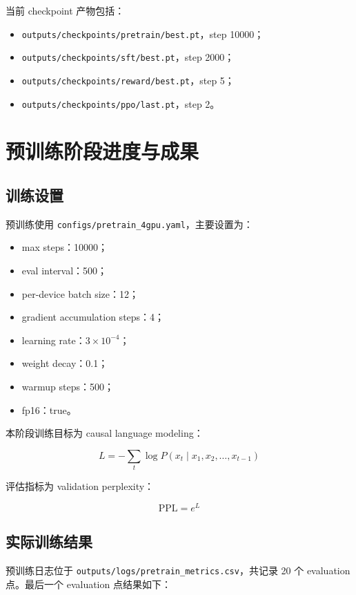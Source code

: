 \documentclass[UTF8,zihao=-4]{ctexart}
\begin{document}
当前 checkpoint 产物包括：

\begin{itemize}
  \item \texttt{outputs/checkpoints/pretrain/best.pt}，step 10000；
  \item \texttt{outputs/checkpoints/sft/best.pt}，step 2000；
  \item \texttt{outputs/checkpoints/reward/best.pt}，step 5；
  \item \texttt{outputs/checkpoints/ppo/last.pt}，step 2。
\end{itemize}

\section{预训练阶段进度与成果}

\subsection{训练设置}

预训练使用 \texttt{configs/pretrain\_4gpu.yaml}，主要设置为：

\begin{itemize}
  \item max steps：10000；
  \item eval interval：500；
  \item per-device batch size：12；
  \item gradient accumulation steps：4；
  \item learning rate：$3\times 10^{-4}$；
  \item weight decay：0.1；
  \item warmup steps：500；
  \item fp16：true。
\end{itemize}

本阶段训练目标为 causal language modeling：

\[
L = - \sum_t \log P(x_t \mid x_1, x_2,\ldots,x_{t-1})
\]

评估指标为 validation perplexity：

\[
\mathrm{PPL} = e^{L}
\]

\subsection{实际训练结果}

预训练日志位于 \texttt{outputs/logs/pretrain\_metrics.csv}，共记录 20 个 evaluation 点。最后一个 evaluation 点结果如下：
\end{document}
